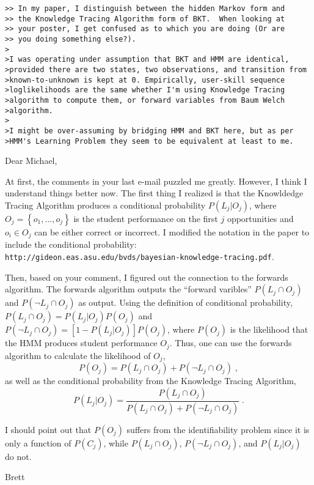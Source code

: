 \documentclass{report}
\begin{document}
\begin{verbatim}
>> In my paper, I distinguish between the hidden Markov form and
>> the Knowledge Tracing Algorithm form of BKT.  When looking at
>> your poster, I get confused as to which you are doing (Or are
>> you doing something else?).
>
>I was operating under assumption that BKT and HMM are identical,
>provided there are two states, two observations, and transition from
>known-to-unknown is kept at 0. Empirically, user-skill sequence
>loglikelihoods are the same whether I'm using Knowledge Tracing
>algorithm to compute them, or forward variables from Baum Welch
>algorithm.
>
>I might be over-assuming by bridging HMM and BKT here, but as per
>HMM's Learning Problem they seem to be equivalent at least to me.
\end{verbatim}

Dear Michael,

At first, the comments in your last e-mail puzzled me greatly.
However, I think I understand things better now.
The first thing I realized is that 
the Knowldedge Tracing Algorithm produces a conditional probability
$P(L_j|O_j)$, where $O_j=\left\{o_1,\ldots,o_j\right\}$ is the 
student performance on the first $j$ opportunities and $o_i\in O_j$ 
can be either correct or incorrect.
I modified the notation in the paper to include the conditional
probability:\\
\verb|http://gideon.eas.asu.edu/bvds/bayesian-knowledge-tracing.pdf|.

Then, based on your comment, I figured out the connection to the
forwards algorithm.  The forwards algorithm outputs the 
``forward varibles'' $P(L_j \cap O_j)$ and
$P(\neg L_j \cap O_j)$ as output.  Using the definition of conditional
probability, $P(L_j \cap O_j)=P(L_j|O_j) P(O_j)$ and 
$P(\neg L_j \cap O_j)=\left[1-P(L_j|O_j)\right] P(O_j)$, where $P(O_j)$ is
the likelihood that the HMM produces student performance $O_j$.  
Thus, one can use the forwards algorithm to calculate the likelihood of 
$O_j$,
%
\begin{equation}
P(O_j)=P(L_j\cap O_j) +P(\neg L_j \cap O_j) \; ,
\end{equation}
%
as well as the conditional probability from the Knowledge Tracing
Algorithm,
%
\begin{equation}
 P(L_j|O_j)=\frac{P(L_j\cap O_j)}{ P(L_j\cap O_j) +P(\neg L_j \cap
   O_j)} \; .
\end{equation}
%


I should point out that  $P(O_j)$ suffers from the identifiability
problem since it is only a function of $P(C_j)$, while
$P(L_j \cap O_j)$, $P(\neg L_j \cap O_j)$, and $P(L_j|O_j)$ do not.

Brett
\end{document}
